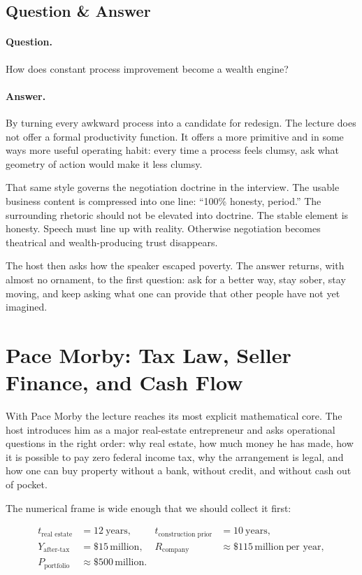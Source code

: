 \subsection{Question \& Answer}

\paragraph{Question.} How does constant process improvement become a wealth engine?

\paragraph{Answer.} By turning every awkward process into a candidate for redesign. The lecture does not offer a formal productivity function. It offers a more primitive and in some ways more useful operating habit: every time a process feels clumsy, ask what geometry of action would make it less clumsy.

That same style governs the negotiation doctrine in the interview. The usable business content is compressed into one line: ``100\% honesty, period.'' The surrounding rhetoric should not be elevated into doctrine. The stable element is honesty. Speech must line up with reality. Otherwise negotiation becomes theatrical and wealth-producing trust disappears.

The host then asks how the speaker escaped poverty. The answer returns, with almost no ornament, to the first question: ask for a better way, stay sober, stay moving, and keep asking what one can provide that other people have not yet imagined.

\section{Pace Morby: Tax Law, Seller Finance, and Cash Flow}

With Pace Morby the lecture reaches its most explicit mathematical core. The host introduces him as a major real-estate entrepreneur and asks operational questions in the right order: why real estate, how much money he has made, how it is possible to pay zero federal income tax, why the arrangement is legal, and how one can buy property without a bank, without credit, and without cash out of pocket.

The numerical frame is wide enough that we should collect it first:

\begin{align}
t_{\text{real estate}}&=12\ \text{years},
&
t_{\text{construction prior}}&=10\ \text{years},\\
Y_{\text{after-tax}}&=\$15\,\text{million},
&
R_{\text{company}}&\approx \$115\,\text{million}\ \text{per year},\\
P_{\text{portfolio}}&\approx \$500\,\text{million}.&
\end{align}

